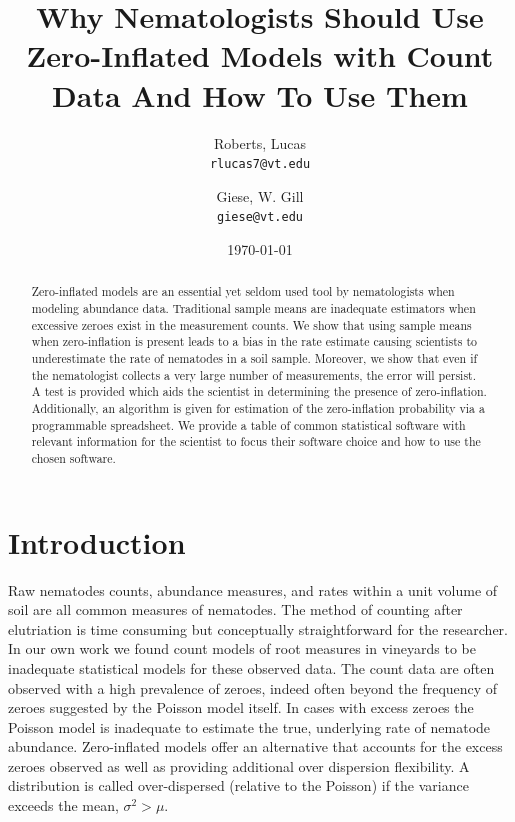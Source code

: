 \documentclass{article}
\author{
  Roberts, Lucas\\
  \texttt{rlucas7@vt.edu}
  \and
Giese, W. Gill \\
  \texttt{giese@vt.edu}
}
\date{\today}
\begin{document}
\title{
Why Nematologists Should Use Zero-Inflated Models with Count Data And How To Use Them
}

\maketitle

\begin{abstract}
Zero-inflated models are an essential yet seldom used tool by nematologists when modeling abundance data. Traditional sample means are inadequate estimators when excessive zeroes exist in the measurement counts. We show that using sample means when zero-inflation is present leads to a bias in the rate estimate causing scientists to underestimate the rate of nematodes in a soil sample. Moreover, we show that even if the nematologist collects a very large number of measurements, the error will persist. A test is provided which aids the scientist in determining the presence of zero-inflation. Additionally, an algorithm is given for estimation of the zero-inflation probability via a programmable spreadsheet. We provide a table of common statistical software with relevant information for the scientist to focus their software choice and how to use the chosen software. 
\end{abstract}

\section{Introduction}
Raw nematodes counts, abundance measures, and rates within a unit volume of soil are all common measures of nematodes. The method of counting after elutriation is time consuming but conceptually straightforward for the researcher. In our own work \cite{giese2016cover} we found count models of root measures in vineyards to be inadequate statistical models for these observed data. The count data are often observed with a high prevalence of zeroes, indeed often beyond the frequency of zeroes suggested by the Poisson model itself. In cases with excess zeroes the Poisson model is inadequate to estimate the true, underlying rate of nematode abundance. Zero-inflated models offer an alternative that accounts for the excess zeroes observed as well as providing additional over dispersion flexibility. A distribution is called over-dispersed (relative to the Poisson) if the variance exceeds the mean, $\sigma^2 > \mu$. 
\end{document}
